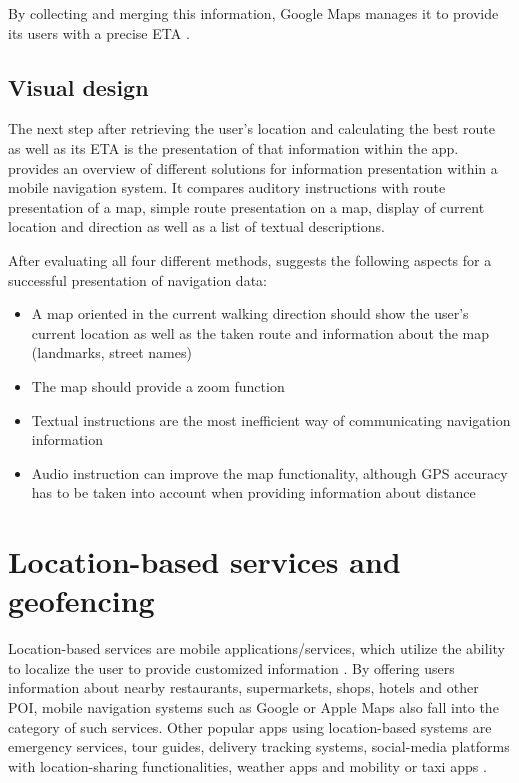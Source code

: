 By collecting and merging this information, Google Maps manages it to provide its users with a precise ETA \cite{google_maps}.

\subsection{Visual design}
The next step after retrieving the user's location and calculating the best route as well as its ETA is the presentation of that information within the app. \cite{visual_design_of_navigation_system} provides an overview of different solutions for information presentation within a mobile navigation system. It compares auditory instructions with route presentation of a map, simple route presentation on a map, display of current location and direction as well as a list of textual descriptions.

After evaluating all four different methods, \cite{visual_design_of_navigation_system} suggests the following aspects for a successful presentation of navigation data:

\begin{itemize}
    \item A map oriented in the current walking direction should show the user's current location as well as the taken route and information about the map (landmarks, street names)
    \item The map should provide a zoom function
    \item Textual instructions are the most inefficient way of communicating navigation information
    \item Audio instruction can improve the map functionality, although GPS accuracy has to be taken into account when providing information about distance
\end{itemize}

\section{Location-based services and geofencing}
Location-based services are mobile applications/services, which utilize the ability to localize the user to provide customized information \cite{location_based_services}. By offering users information about nearby restaurants, supermarkets, shops, hotels and other POI, mobile navigation systems such as Google \cite{google_maps_website} or Apple Maps \cite{apple_maps_website} also fall into the category of such services. Other popular apps using location-based systems are emergency services, tour guides, delivery tracking systems, social-media platforms with location-sharing functionalities, weather apps and mobility or taxi apps \cite{geofencing_and_background_tracking} \cite{Sadhukhan2021}.


